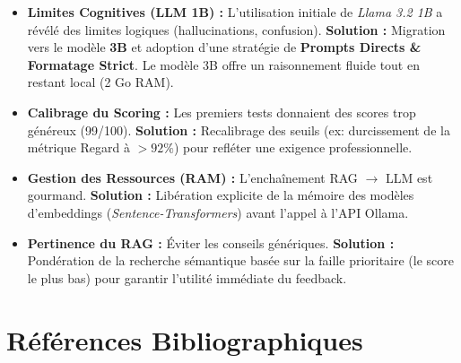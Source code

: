 \documentclass[12pt,a4paper]{article}
\begin{document}
\begin{itemize}
    \item \textbf{Limites Cognitives (LLM 1B) :} L'utilisation initiale de \textit{Llama 3.2 1B} a révélé des limites logiques (hallucinations, confusion). \textbf{Solution :} Migration vers le modèle \textbf{3B} et adoption d'une stratégie de \textbf{Prompts Directs \& Formatage Strict}. Le modèle 3B offre un raisonnement fluide tout en restant local (2 Go RAM).
    \item \textbf{Calibrage du Scoring :} Les premiers tests donnaient des scores trop généreux (99/100). \textbf{Solution :} Recalibrage des seuils (ex: durcissement de la métrique Regard à $>92\%$) pour refléter une exigence professionnelle.
    \item \textbf{Gestion des Ressources (RAM) :} L'enchaînement RAG $\rightarrow$ LLM est gourmand. \textbf{Solution :} Libération explicite de la mémoire des modèles d'embeddings (\textit{Sentence-Transformers}) avant l'appel à l'API Ollama.
    \item \textbf{Pertinence du RAG :} Éviter les conseils génériques. \textbf{Solution :} Pondération de la recherche sémantique basée sur la faille prioritaire (le score le plus bas) pour garantir l'utilité immédiate du feedback.
\end{itemize}

\section{Références Bibliographiques}
\nocite{*}


\end{document}
